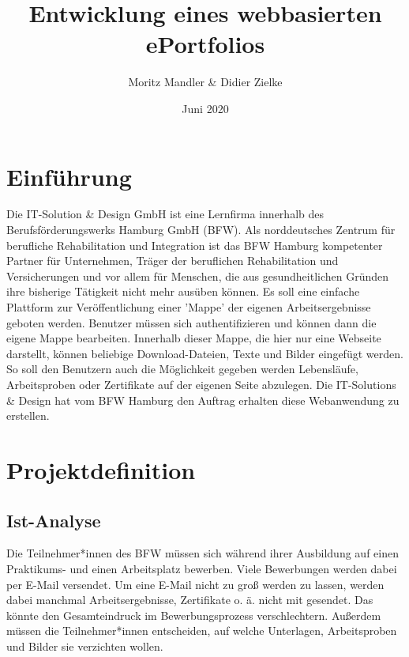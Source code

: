 \documentclass[10pt]{article}
\title{Entwicklung eines webbasierten ePortfolios}
\author{Moritz Mandler \& Didier Zielke}
\date{Juni 2020}
\begin{document}
\maketitle


\newpage

\tableofcontents

\newpage

\section{Einführung}

Die IT-Solution \& Design GmbH ist eine Lernfirma innerhalb des Berufsförderungswerks Hamburg GmbH (BFW). Als norddeutsches Zentrum für berufliche Rehabilitation und Integration ist das BFW Hamburg kompetenter Partner für Unternehmen, Träger der beruflichen Rehabilitation und Versicherungen und vor allem für Menschen, die aus gesundheitlichen Gründen ihre bisherige Tätigkeit nicht mehr ausüben können.  
Es soll eine einfache Plattform zur Veröffentlichung einer 'Mappe' der eigenen Arbeitsergebnisse geboten werden. Benutzer müssen sich authentifizieren und können dann die eigene Mappe bearbeiten. Innerhalb dieser Mappe, die hier nur eine Webseite darstellt, können beliebige Download-Dateien, Texte und Bilder eingefügt werden. So soll den Benutzern auch die Möglichkeit gegeben werden Lebensläufe, Arbeitsproben oder Zertifikate auf der eigenen Seite abzulegen.
Die IT-Solutions \& Design hat vom BFW Hamburg den Auftrag erhalten diese Webanwendung zu erstellen. 

\section{Projektdefinition}
\subsection{Ist-Analyse}

Die Teilnehmer*innen des BFW müssen sich während ihrer Ausbildung auf einen Praktikums- und einen Arbeitsplatz bewerben. Viele Bewerbungen werden dabei per E-Mail versendet. Um eine E-Mail nicht zu groß werden zu lassen, werden dabei manchmal Arbeitsergebnisse, Zertifikate o. ä. nicht mit gesendet. Das könnte den Gesamteindruck im Bewerbungsprozess verschlechtern.  
 Außerdem müssen die Teilnehmer*innen entscheiden, auf welche Unterlagen, Arbeitsproben und Bilder sie verzichten wollen.
 
\end{document}
